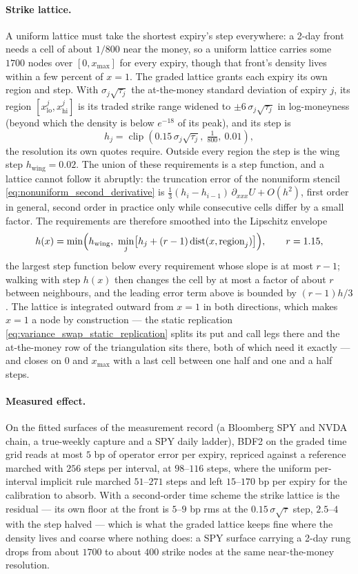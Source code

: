 \documentclass[11pt]{article}
\newcommand{\1}{\mathbf{1}}
\newcommand{\xmax}{x_{\max}}
\begin{document}
\paragraph{Strike lattice.}
A uniform lattice must take the shortest expiry's step everywhere: a 2-day front needs a
cell of about $1/800$ near the money, so a uniform lattice carries some $1700$ nodes over
$[0,\xmax]$ for every expiry, though that front's density lives within a few percent of
$x=1$. The graded lattice grants each expiry its own region and step. With
$\sigma_j\sqrt{\tau_j}$ the at-the-money standard deviation of expiry $j$, its region
$[x_{\mathrm{lo}}^j,x_{\mathrm{hi}}^j]$ is its traded strike range widened to
$\pm6\,\sigma_j\sqrt{\tau_j}$ in log-moneyness (beyond which the density is below
$e^{-18}$ of its peak), and its step is
\[
  h_j=\operatorname{clip}\!\left(0.15\,\sigma_j\sqrt{\tau_j},\ \tfrac1{800},\ 0.01\right),
\]
the resolution its own quotes require. Outside every region the step is the wing step
$h_{\mathrm{wing}}=0.02$. The union of these requirements is a step function, and a
lattice cannot follow it abruptly: the truncation error of the nonuniform stencil
\eqref{eq:nonuniform_second_derivative} is
$\tfrac13(h_i-h_{i-1})\,\partial_{xxx}U+O(h^2)$, first order in general, second order
in practice only while consecutive cells differ by a small factor. The requirements are
therefore smoothed into the Lipschitz envelope
\[
  h(x)=\min\Bigl(h_{\mathrm{wing}},\ \min_j\bigl[h_j+(r-1)\operatorname{dist}(x,\text{region}_j)\bigr]\Bigr),
  \qquad r=1.15,
\]
the largest step function below every requirement whose slope is at most $r-1$; walking
with step $h(x)$ then changes the cell by at most a factor of about $r$ between
neighbours, and the leading error term above is bounded by $(r-1)h/3$. The lattice is
integrated outward from $x=1$ in both directions, which makes $x=1$ a node by
construction --- the static replication \eqref{eq:variance_swap_static_replication}
splits its put and call legs there and the at-the-money row of the triangulation sits
there, both of which need it exactly --- and closes on $0$ and $\xmax$ with a last cell
between one half and one and a half steps.

\paragraph{Measured effect.}
On the fitted surfaces of the measurement record (a Bloomberg SPY and NVDA chain, a
true-weekly capture and a SPY daily ladder), BDF2 on the graded time grid reads at most
$5$ bp of operator error per expiry, repriced against a reference marched with $256$
steps per interval, at $98$--$116$ steps, where the uniform per-interval implicit rule
marched $51$--$271$ steps and left $15$--$170$ bp per expiry for the calibration to
absorb. With a second-order time scheme the strike lattice is the residual --- its own
floor at the front is $5$--$9$ bp rms at the $0.15\,\sigma\sqrt\tau$ step, $2.5$--$4$
with the step halved --- which is what the graded lattice keeps fine where the density
lives and coarse where nothing does: a SPY surface carrying a 2-day rung drops from
about $1700$ to about $400$ strike nodes at the same near-the-money resolution.
\end{document}
